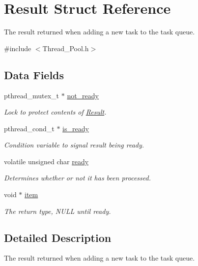 \hypertarget{struct_result}{}\section{Result Struct Reference}
\label{struct_result}


The result returned when adding a new task to the task queue.  




{\ttfamily \#include $<$Thread\+\_\+\+Pool.\+h$>$}

\subsection*{Data Fields}
\begin{DoxyCompactItemize}
\item 
pthread\+\_\+mutex\+\_\+t $\ast$ \hyperlink{struct_result_a29a502fc8aca81df1310e7c10c3d99af}{not\+\_\+ready}
\begin{DoxyCompactList}\small\item\em Lock to protect contents of \textquotesingle{}\hyperlink{struct_result}{Result}\textquotesingle{}. \end{DoxyCompactList}\item 
pthread\+\_\+cond\+\_\+t $\ast$ \hyperlink{struct_result_a8f707934732f685f1b1b53a855de60d4}{is\+\_\+ready}
\begin{DoxyCompactList}\small\item\em Condition variable to signal result being ready. \end{DoxyCompactList}\item 
volatile unsigned char \hyperlink{struct_result_a7ad32217267e7e0144abffa4e782867c}{ready}
\begin{DoxyCompactList}\small\item\em Determines whether or not it has been processed. \end{DoxyCompactList}\item 
void $\ast$ \hyperlink{struct_result_aeeeae972d4d97226aa998aa9ca91346c}{item}
\begin{DoxyCompactList}\small\item\em The return type, N\+U\+L\+L until ready. \end{DoxyCompactList}\end{DoxyCompactItemize}


\subsection{Detailed Description}
The result returned when adding a new task to the task queue. 

